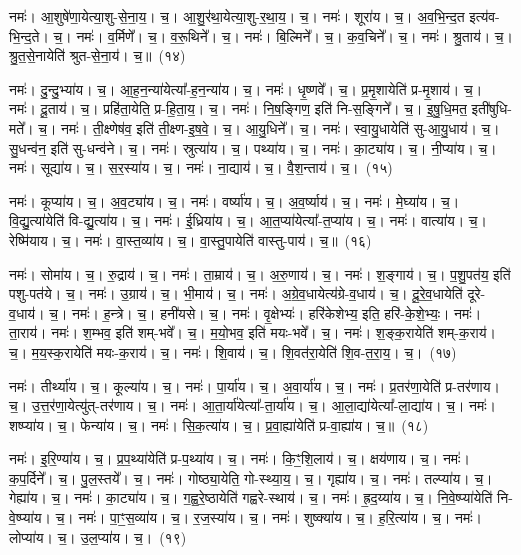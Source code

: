 नमः॑। आ॒शुषे॑णा॒येत्या॒शु-से॒ना॒य॒। च॒। आ॒शु॒र॑था॒येत्या॒शु-र॒था॒य॒। च॒। 
नमः॑। शूरा॑य। च॒। अ॒व॒भि॒न्द॒त इत्य॑व-भि॒न्द॒ते। च॒। 
नमः॑। व॒र्मिणे᳚। च॒। व॒रू॒थिने᳚। च॒। 
नमः॑। बि॒ल्मिने᳚। च॒। क॒व॒चिने᳚। च॒। 
नमः॑। श्रु॒ताय॑। च॒। श्रु॒त॒से॒नायेति॑ श्रुत-से॒ना॒य॑। च॒॥~(१४)


नमः॑। दु॒न्दु॒भ्या॑य। च॒। आ॒ह॒न॒न्या॑येत्या᳚-ह॒न॒न्या॑य। च॒। 
नमः॑। धृ॒ष्णवे᳚। च॒। प्र॒मृ॒शायेति॑ प्र-मृ॒शाय॑। च॒। 
नमः॑। दू॒ताय॑। च॒। प्रहि॑ता॒येति॒ प्र-हि॒ता॒य॒। च॒। 
नमः॑। नि॒ष॒ङ्गिण॒ इति॑ नि-स॒ङ्गिने᳚। च॒। इ॒षु॒धि॒मत॒ इती॑षुधि-मते᳚। च॒। 
नमः॑। ती॒क्ष्णेष॑व॒ इति॑ ती॒क्ष्ण-इ॒ष॒वे॒। च॒। आ॒यु॒धिने᳚। च॒। 
नमः॑। स्वा॒यु॒धायेति॑ सु-आ॒यु॒धाय॑। च॒। सु॒धन्व॑न॒ इति॑ सु-धन्व॑ने। च॒। 
नमः॑। स्रुत्या॑य। च॒। पथ्या॑य। च॒। 
नमः॑। का॒ट्या॑य। च॒। नी॒प्या॑य। च॒। 
नमः॑। सूद्या॑य। च॒। स॒र॒स्या॑य। च॒। 
नमः॑। ना॒द्याय॑। च॒। वै॒श॒न्ताय॑। च॒।~(१५)


नमः॑। कूप्या॑य। च॒। अ॒व॒ट्या॑य। च॒। 
नमः॑। वर्ष्या॑य। च॒। अ॒व॒र्ष्याय॑। च॒। 
नमः॑। मे॒घ्या॑य। च॒। वि॒द्यु॒त्या॑येति॑ वि-द्यु॒त्या॑य। च॒। 
नमः॑। ई॒ध्रिया॑य। च॒। आ॒त॒प्या॑येत्या᳚-त॒प्या॑य। च॒। 
नमः॑। वात्या॑य। च॒। रेष्मि॑याय। च॒। 
नमः॑। वा॒स्त॒व्या॑य। च॒। वा॒स्तु॒पायेति॑ वास्तु-पाय॑। च॒॥~(१६)


नमः॑। सोमा॑य। च॒। रु॒द्राय॑। च॒। 
नमः॑। ता॒म्राय॑। च॒। अ॒रु॒णाय॑। च॒। 
नमः॑। श॒ङ्गाय॑। च॒। प॒शु॒पत॑य॒ इति॑ पशु-पत॑ये। च॒। 
नमः॑। उ॒ग्राय॑। च॒। भी॒माय॑। च॒। 
नमः॑। अ॒ग्रे॒व॒धायेत्य॑ग्रे-व॒धाय॑। च॒। दू॒रे॒व॒धायेति॑ दूरे-व॒धाय॑। च॒। 
नमः॑। ह॒न्त्रे। च॒। हनी॑यसे। च॒। 
नमः॑। वृ॒क्षेभ्यः॑। हरि॑केशेभ्य॒ इति॒ हरि॑-के॒शे॒भ्यः॒। 
नमः॑। ता॒राय॑। नमः॑। श॒म्भव॒ इति॑ शम्-भवे᳚। च॒। म॒यो॒भव॒ इति॑ मयः-भवे᳚। च॒। 
नमः॑। श॒ङ्क॒रायेति॑ शम्-क॒राय॑। च॒। म॒य॒स्क॒रायेति॑ मयः-क॒राय॑। च॒। 
नमः॑। शि॒वाय॑। च॒। शि॒वत॑रा॒येति॑ शि॒व-त॒रा॒य॒। च॒।~(१७)


नमः॑। तीर्थ्या॑य। च॒। कूल्या॑य। च॒। 
नमः॑। पा॒र्या॑य। च॒। अ॒वा॒र्या॑य। च॒। 
नमः॑। प्र॒तर॑णा॒येति॑ प्र-तर॑णाय। च॒। उ॒त्त॒र॑णा॒येत्यु॑त्-तर॑णाय। च॒। 
नमः॑। आ॒ता॒र्या॑येत्या᳚-ता॒र्या॑य। च॒। आ॒ला॒द्या॑येत्या᳚-ला॒द्या॑य। च॒। 
नमः॑। शष्प्या॑य। च॒। फेन्या॑य। च॒। 
नमः॑। सि॒क॒त्या॑य। च॒। प्र॒वा॒ह्या॑येति॑ प्र-वा॒ह्या॑य। च॒॥~(१८)


नमः॑। इ॒रि॒ण्या॑य। च॒। प्र॒प॒थ्या॑येति॑ प्र-प॒थ्या॑य। च॒। 
नमः॑। कि॒ꣳ॒शि॒लाय॑। च॒। क्षय॑णाय। च॒। 
नमः॑। क॒प॒र्दिने᳚। च॒। पु॒ल॒स्तये᳚। च॒। 
नमः॑। गोष्ठ्या॒येति॒ गो-स्थ्या॒य॒। च॒। गृह्या॑य। च॒। 
नमः॑। तल्प्या॑य। च॒। गेह्या॑य। च॒। 
नमः॑। का॒ट्या॑य। च॒। ग॒ह्व॒रे॒ष्ठायेति॑ गह्वरे-स्थाय॑। च॒। 
नमः॑। ह्र॒द॒य्या॑य। च॒। नि॒वे॒ष्प्या॑येति॑ नि-वे॒ष्प्या॑य। च॒। 
नमः॑। पा॒ꣳ॒स॒व्या॑य। च॒। र॒ज॒स्या॑य। च॒। 
नमः॑। शुष्क्या॑य। च॒। ह॒रि॒त्या॑य। च॒। 
नमः॑। लोप्या॑य। च॒। उ॒ल॒प्या॑य। च॒।~(१९)


